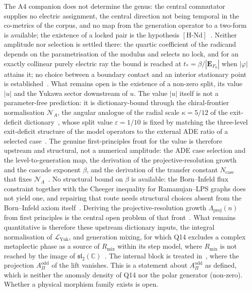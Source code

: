 \documentclass[11pt,a4paper]{article}
\theoremstyle{definition}
\newcommand{\HNd}{\ensuremath{[\mathrm{H\text{-}Nd}]}}
\newcommand{\LYuk}{\mathcal{L}_{\mathrm{Yuk}}}
\newcommand{\AOdd}{A_\Pi^{\mathrm{odd}}}
\begin{document}
    The A4 companion does not determine the genus: the central commutator supplies no electric assignment, the
    central direction not being temporal in the co-metrics of the corpus, and no map from the generation operator to a
    two-form is available; the existence of a locked pair is the hypothesis \HNd{}~\cite{Beau2026bim}.
    Neither amplitude nor selection is settled there: the quartic coefficient of the radicand depends on the
    parametrisation of the modulus and selects no lock, and for an exactly collinear purely electric ray the bound is
    reached at $t_*=\beta/|\mathbf{E}_{F_0}|$ when $|\varphi|$ attains it; no choice between a boundary contact and an interior stationary point is
    established~\cite{Beau2026bim}.
    What remains open is the existence of a non-zero split, its value $|u|$ and the Yukawa sector downstream of $u$.
    The value $|u|$ itself is not a parameter-free prediction: it is dictionary-bound through the chiral-frontier
    normalisation $\mathcal N_A$, the angular analogue of the radial scale $\kappa=5/12$ of the exit-deficit
    dictionary~\cite{Beau2026aar, Beau2026q14}, whose split value $\varepsilon=1/10$ is fixed by matching the
    three-level exit-deficit structure of the model operators to the external ADE ratio of a selected
    case~\cite{Beau2026a4}.
    The genuine first-principles front for the value is therefore upstream and structural, not a numerical amplitude:
    the ADE case selection and the level-to-generation map, the derivation of the projective-resolution growth and the
    cascade exponent $\beta$, and the derivation of the transfer
    constant $N_{\mathrm{casc}}$ that fixes $\mathcal N_A$~\cite{Beau2026q14}.
    No structural bound on $\beta$ is available: the Born--Infeld flux constraint together with the
    Cheeger inequality for Ramanujan--LPS graphs does not yield one, and repairing that route needs
    structural choices absent from the Born--Infeld axiom itself~\cite{Beau2026a8}.
    Deriving the projective-resolution growth $\Lambda_{\mathrm{proj}}(n)$ from first principles is
    the central open problem of that front~\cite{Beau2026a4}.
    What remains quantitative is therefore these upstream dictionary inputs, the integral normalisation of
    $\LYuk$, and generation mixing, for which Q14 excludes a complex metaplectic phase as a source of
    $R_{\mathrm{mix}}$ within its step model, where $R_{\mathrm{mix}}$ is not reached by the image of
    $\mathfrak{sl}_2(\mathbb{C})$~\cite{Beau2026q14}.
    The internal block is treated in~\cite{Beau2026pyo}, where the projection $\AOdd$ of the lift vanishes.
    This is a statement about $\AOdd$ as defined, which is neither the anomaly density of Q14 nor the polar generator
    (non-zero).
    Whether a physical morphism family exists is open.
\end{document}
